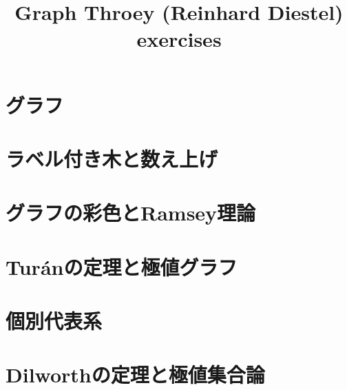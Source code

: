 \documentclass{jarticle}
\title{Graph Throey (Reinhard Diestel) exercises}
\begin{document}
\maketitle

\section{グラフ}











\newpage

\section{ラベル付き木と数え上げ}









\newpage

\section{グラフの彩色とRamsey理論}












\newpage

\section{Tur\'{a}nの定理と極値グラフ}










\newpage

\section{個別代表系}








\newpage

\section{Dilworthの定理と極値集合論}





\end{document}
